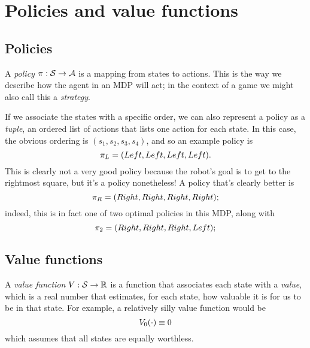 \documentclass[a4paper]{article}
\begin{document}
\section{Policies and value functions}
\subsection{Policies}
A \emph{policy} $\pi : \mathcal{S} \to \mathcal{A}$ is a mapping from states to
actions.
This is the way we describe how the agent in an MDP will act;
in the context of a game we might also call this a \emph{strategy}.

If we associate the states with a specific order, we can also represent a
policy as a \emph{tuple}, an ordered list of actions that
lists one action for each state.
In this case, the obvious ordering is $(s_1, s_2, s_3, s_4)$,
and so an example policy is
\begin{equation*}
  \pi_L = (Left, Left, Left, Left) .
\end{equation*}
This is clearly not a very good policy because the robot's goal is to
get to the rightmost square, but it's a policy nonetheless!
A policy that's clearly better is
\begin{equation*}
  \pi_R = (Right, Right, Right, Right) ;
\end{equation*}
indeed, this is in fact one of two optimal policies in this MDP,
along with
\begin{equation*}
  \pi_2 = (Right, Right, Right, Left) ;
\end{equation*}

\subsection{Value functions}
A \emph{value function} $V : \mathcal{S} \to \mathbb{R}$ is a function that associates
each state with a \emph{value}, which is a real number that estimates, for
each state, how valuable it is for us to be in that state.
For example, a relatively silly value function would be
\begin{equation*}
  V_0(\cdot) \equiv 0
\end{equation*}
which assumes that all states are equally worthless.
\end{document}
